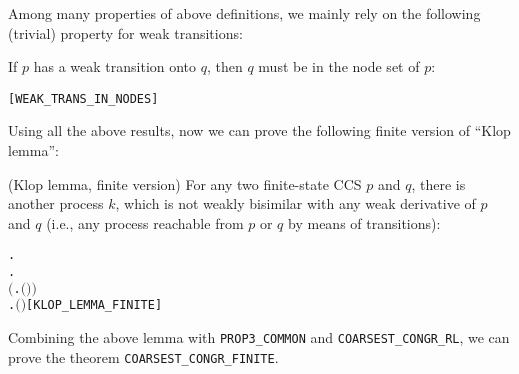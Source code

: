 Among many properties of above definitions, we mainly rely on the
following (trivial) property for weak transitions:
\begin{proposition}
If $p$ has a weak transition onto $q$, then $q$ must be in the node set of $p$:
\begin{alltt}
\HOLTokenTurnstile{}  \HOLTokenWeakTransBegin{}\HOLTokenWeakTransEnd {} \HOLSymConst{\HOLTokenImp{}}  \HOLSymConst{\HOLTokenIn{}}  \hfill[WEAK_TRANS_IN_NODES]
\end{alltt}
\end{proposition}

Using all the above results, now we can prove the following finite
version of ``Klop lemma'':
\begin{lemma}{(Klop lemma,  finite version)}
\label{lem:klop-lemma-finite}
For any two finite-state CCS $p$ and $q$, there is another process
$k$, which is not weakly bisimilar 
with
 any weak derivative  of $p$
and $q$ (i.e., any process reachable from $p $ or $q$ by means of transitions):
\begin{alltt}
\HOLTokenTurnstile{} \HOLSymConst{\HOLTokenForall{}} .
         \HOLSymConst{\HOLTokenConj{}}   \HOLSymConst{\HOLTokenImp{}}
       \HOLSymConst{\HOLTokenExists{}}.
             \HOLSymConst{\HOLTokenConj{}} \ensuremath{(}\HOLSymConst{\HOLTokenForall{}} .  \HOLTokenWeakTransBegin{}\HOLTokenWeakTransEnd {} \HOLSymConst{\HOLTokenImp{}} \HOLSymConst{\HOLTokenNeg{}}\ensuremath{(} \HOLSymConst{\HOLTokenWeakEQ} \ensuremath{)}\ensuremath{)} \HOLSymConst{\HOLTokenConj{}}
           \HOLSymConst{\HOLTokenForall{}} .  \HOLTokenWeakTransBegin{}\HOLTokenWeakTransEnd {} \HOLSymConst{\HOLTokenImp{}} \HOLSymConst{\HOLTokenNeg{}}\ensuremath{(} \HOLSymConst{\HOLTokenWeakEQ} \ensuremath{)}\hfill{[KLOP_LEMMA_FINITE]}
\end{alltt}
\end{lemma}

Combining the above lemma with \texttt{PROP3_COMMON} and \texttt{COARSEST_CONGR_RL},
we can prove the theorem \texttt{COARSEST_CONGR_FINITE}.

